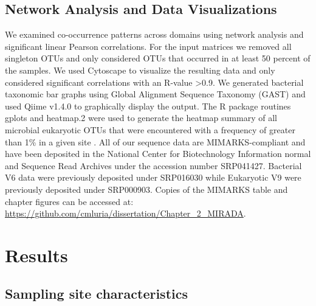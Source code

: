 \subsection{Network Analysis and Data Visualizations}\label{ssc:network-analysis-and-data-visualizations}

We examined co-occurrence patterns across domains using network analysis and significant linear Pearson correlations. For the input matrices we removed all singleton OTUs and only considered OTUs that occurred in at least 50 percent of the samples. We used Cytoscape \citep{smobwr} to visualize the resulting data and only considered significant correlations with an R-value \textgreater{}0.9. We generated bacterial taxonomic bar graphs using Global Alignment Sequence Taxonomy (GAST) \citep{hdhwrs08} and used Qiime v1.4.0 \citep{Caporaso2010-ee} to graphically display the output. The R package routines gplots and heatmap.2 were used to generate the heatmap summary of all microbial eukaryotic OTUs that were encountered with a frequency of greater than 1\% in a given site \citep{t08}. All of our sequence data are MIMARKS-compliant \citep{Yilmaz:2011aa} and have been deposited in the National Center for Biotechnology Information normal and Sequence Read Archives under the accession number SRP041427. Bacterial V6 data were previously deposited under SRP016030 while Eukaryotic V9 were previously deposited under SRP000903. Copies of the MIMARKS table and chapter figures can be accessed at: \url{https://github.com/cmluria/dissertation/Chapter_2_MIRADA}. 

\section{Results}\label{sc:results}

\subsection{Sampling site characteristics}\label{ssc:sampling-site-characteristics}

